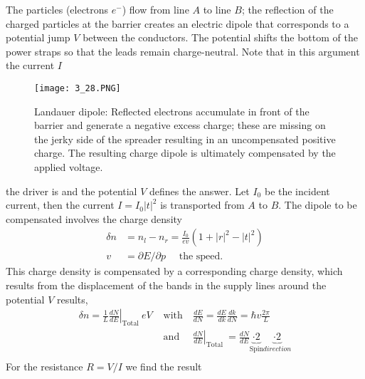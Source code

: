 The particles (electrons $e^-$) flow from line $A$ to line $B$; the reflection of the charged particles at the barrier creates an electric dipole that corresponds to a potential jump $V$ between the conductors. The potential shifts the bottom of the power straps so that the leads remain charge-neutral. Note that in this argument the current $I$
\begin{figure}[ht]
    \begin{minipage}{0.5\textwidth}
        \centering
        \texttt{[image: 3\_28.PNG]}
    \end{minipage}
    \begin{minipage}{0.5\textwidth}
        \caption{Landauer dipole: Reflected electrons accumulate in front of the barrier and generate a negative excess charge; these are missing on the jerky side of the spreader resulting in an uncompensated positive charge. The resulting charge dipole is ultimately compensated by the applied voltage.}
    \end{minipage}
\end{figure}
the driver is and the potential $V$ defines the answer. Let $I_0$ be the incident current, then the current $I = I_0 | t |^2$ is transported from $A$ to $B$. The dipole to be compensated involves the charge density
\begin{equation}
\begin{aligned} \delta n &=n_{l}-n_{r}=\frac{I_{0}}{e v}\left(1+|r|^{2}-|t|^{2}\right) \\ v &=\partial E / \partial p \quad \text { the speed. } \end{aligned}
\end{equation}
This charge density is compensated by a corresponding charge density, which results from the displacement of the bands in the supply lines around the potential $V$ results,
\begin{equation}
    \begin{split}
        \delta n=\left.\frac{1}{L} \frac{d N}{d E}\right|_{\text {Total }} e V & \text{ with} \quad \frac{d E}{d N}=\frac{d E}{d k} \frac{d k}{d N}=\hbar v \frac{2 \pi}{L}\\
        &\text { and }\left.\quad \frac{d N}{d E}\right|_{\text {Total }}=\frac{d N}{d E} \underbrace{\cdot 2}_{\text {Spin}}\underbrace{\cdot 2}_{direction}\\   
    \end{split}
\end{equation}
For the resistance $R = V / I$ we find the result
